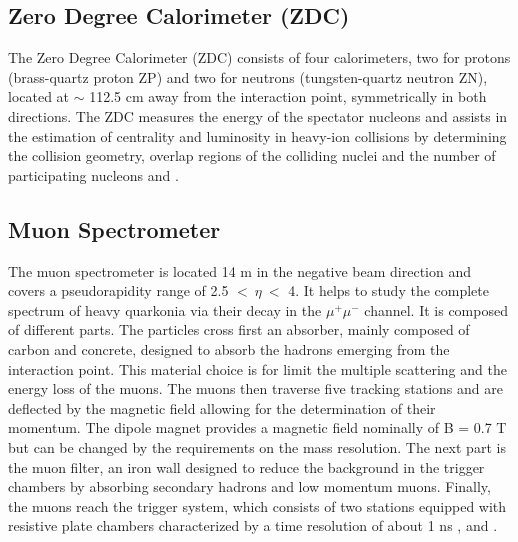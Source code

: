 \documentclass[12pt,a4paper]{book}
\begin{document}
	\subsection{Zero Degree Calorimeter (ZDC)}
	The Zero Degree Calorimeter (ZDC) consists of four calorimeters, two for protons (brass-quartz proton ZP) and two for neutrons (tungsten-quartz neutron ZN), located at $\sim$ 112.5 cm away from the interaction point, symmetrically in both directions. The ZDC measures the energy of the spectator nucleons and assists in the estimation of centrality and luminosity in heavy-ion collisions by determining the collision geometry, overlap regions of the colliding nuclei and the number of participating nucleons \cite{Padhan:2924203} and \cite{amsdottorato9036}.
	
	\subsection{Muon Spectrometer}
	The muon spectrometer is located 14 m in the negative beam direction and covers a pseudorapidity range of 2.5 $<\ \eta\ <$ 4. It helps to study the complete spectrum of heavy quarkonia via their decay in the $\mu^+ \mu^-$ channel. It is composed of different parts. The particles cross first an absorber, mainly composed of carbon and concrete, designed to absorb the hadrons emerging from the interaction point. This material choice is for limit the multiple scattering and the energy loss of the muons. The muons then traverse five tracking stations and are deflected by the magnetic field allowing for the determination of their momentum. The dipole magnet provides a magnetic field nominally of B = 0.7 T but can be changed by the requirements on the mass resolution. The next part is the muon filter, an iron wall designed to reduce the background in the trigger chambers by absorbing secondary hadrons and low momentum muons. Finally, the muons reach the trigger system, which consists of two stations equipped with resistive plate chambers characterized by a time resolution of about 1 ns
	\cite{Padhan:2924203}, \cite{Alicemuonspectometer} and \cite{Herrmann:2920632}.
	
\end{document}
